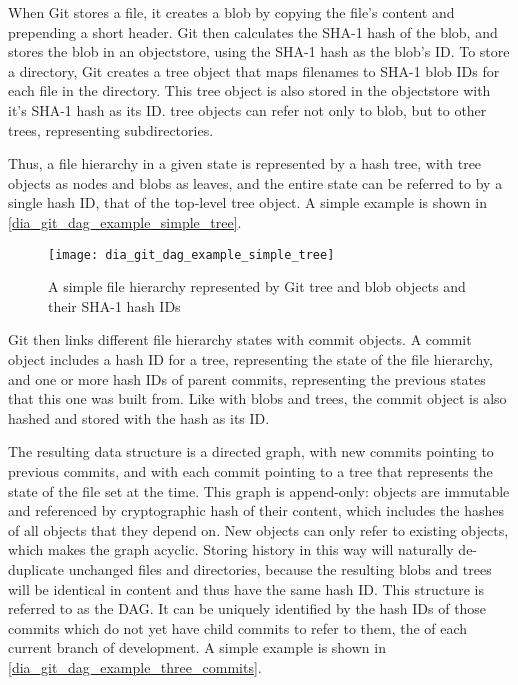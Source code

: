 When Git stores a file, it creates a \gls{blob} by copying the file's content
and prepending a short header. Git then calculates the SHA-1 hash of the
\gls{blob}, and stores the \gls{blob} in an \gls{objectstore}, using the SHA-1
hash as the \gls{blob}'s ID. To store a directory, Git creates a \gls{tree}
object that maps filenames to SHA-1 \gls{blob} IDs for each file in the
directory. This \gls{tree} object is also stored in the \gls{objectstore} with
it's SHA-1 hash as its ID. \Gls{tree} objects can refer not only to \gls{blob},
but to other \glspl{tree}, representing subdirectories.

Thus, a file hierarchy in a given state is represented by a hash tree, with
\gls{tree} objects as nodes and \glspl{blob} as leaves, and the entire state can
be referred to by a single hash ID, that of the top-level \gls{tree} object. A
simple example is shown in \autoref{dia_git_dag_example_simple_tree}.

\begin{figure}[h]
    \centering
    \texttt{[image: dia\_git\_dag\_example\_simple\_tree]}
    \caption{A simple file hierarchy represented by Git tree and blob objects
    and their SHA-1 hash IDs}
    \label{dia_git_dag_example_simple_tree}
\end{figure}

Git then links different file hierarchy states with \gls{commit} objects. A
\gls{commit} object includes a hash ID for a \gls{tree}, representing the state
of the file hierarchy, and one or more hash IDs of parent \glspl{commit},
representing the previous states that this one was built from. Like with
\glspl{blob} and \glspl{tree}, the \gls{commit} object is also hashed and stored
with the hash as its ID.

The resulting data structure is a directed graph, with new \glspl{commit}
pointing to previous \glspl{commit}, and with each \gls{commit} pointing to a
\gls{tree} that represents the state of the file set at the time. This graph is
append-only: objects are immutable and referenced by cryptographic hash of their
content, which includes the hashes of all objects that they depend on. New
objects can only refer to existing objects, which makes the graph acyclic.
Storing history in this way will naturally de-duplicate unchanged files and
directories, because the resulting \glspl{blob} and \glspl{tree} will be
identical in content and thus have the same hash ID. This
 structure is referred to as the
\acrshort{DAG}. It can be uniquely identified by the hash IDs of
those \glspl{commit} which do not yet have child \glspl{commit} to refer to
them, the  of each current branch of development. A simple
example is shown in \autoref{dia_git_dag_example_three_commits}.

